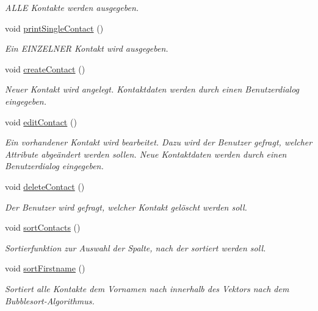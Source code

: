 \begin{DoxyCompactItemize}
\begin{DoxyCompactList}\small\item\em A\+L\+LE Kontakte werden ausgegeben.\end{DoxyCompactList}\item 
void \hyperlink{classContactManager_1_1Controller_a0d8dd997144a1d1654abd4223df9eafb}{print\+Single\+Contact} ()
\begin{DoxyCompactList}\small\item\em Ein E\+I\+N\+Z\+E\+L\+N\+ER Kontakt wird ausgegeben.\end{DoxyCompactList}\item 
void \hyperlink{classContactManager_1_1Controller_abef3b757149e39505248ce0aeabfcd85}{create\+Contact} ()
\begin{DoxyCompactList}\small\item\em Neuer Kontakt wird angelegt. Kontaktdaten werden durch einen Benutzerdialog eingegeben.\end{DoxyCompactList}\item 
void \hyperlink{classContactManager_1_1Controller_ae288c05cd145fc03363c4b9b1f594f9b}{edit\+Contact} ()
\begin{DoxyCompactList}\small\item\em Ein vorhandener Kontakt wird bearbeitet. Dazu wird der Benutzer gefragt, welcher Attribute abgeändert werden sollen. Neue Kontaktdaten werden durch einen Benutzerdialog eingegeben.\end{DoxyCompactList}\item 
void \hyperlink{classContactManager_1_1Controller_a4a22000e1605d3b00af7a7cfd65dd88b}{delete\+Contact} ()
\begin{DoxyCompactList}\small\item\em Der Benutzer wird gefragt, welcher Kontakt gelöscht werden soll.\end{DoxyCompactList}\item 
void \hyperlink{classContactManager_1_1Controller_af56c72c2c38e48a493a164d7e992b964}{sort\+Contacts} ()
\begin{DoxyCompactList}\small\item\em Sortierfunktion zur Auswahl der Spalte, nach der sortiert werden soll.\end{DoxyCompactList}\item 
void \hyperlink{classContactManager_1_1Controller_af659c3cc052470398bc90786606a4bb6}{sort\+Firstname} ()
\begin{DoxyCompactList}\small\item\em Sortiert alle Kontakte dem Vornamen nach innerhalb des Vektors nach dem Bubblesort-\/\+Algorithmus.\end{DoxyCompactList}\item 

\end{DoxyCompactItemize}
